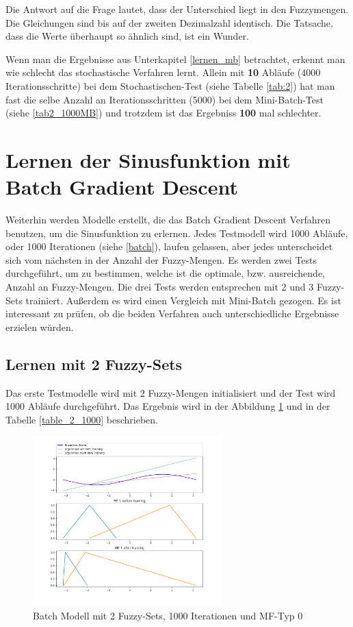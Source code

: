 {Die Antwort auf die Frage lautet, dass der Unterschied liegt in den Fuzzymengen. Die Gleichungen sind bis auf der zweiten Dezimalzahl identisch. Die Tatsache, dass die Werte überhaupt so ähnlich sind, ist ein Wunder.

Wenn man die Ergebnisse aus Unterkapitel \ref{lernen_mb} betrachtet, erkennt man wie schlecht das stochastische Verfahren lernt. Allein mit \textbf{10} Abläufe (4000 Iterationsschritte) bei dem Stochastischen-Test (siehe Tabelle \ref{tab:2}) hat man fast die selbe Anzahl an Iterationsschritten (5000) bei dem Mini-Batch-Test (siehe \ref{tab2_1000MB}) und trotzdem ist das Ergebniss \textbf{100} mal schlechter.

\section{Lernen der Sinusfunktion mit Batch Gradient Descent}
Weiterhin werden Modelle erstellt, die das Batch Gradient Descent Verfahren benutzen, um die Sinusfunktion zu erlernen. Jedes Testmodell wird 1000 Abläufe, oder 1000 Iterationen (siehe \ref{batch}), laufen gelassen, aber jedes unterscheidet sich vom nächsten in der Anzahl der Fuzzy-Mengen. Es werden zwei Tests durchgeführt, um zu bestimmen, welche ist die optimale, bzw. ausreichende, Anzahl an Fuzzy-Mengen. Die drei Tests werden entsprechen mit 2 und 3 Fuzzy-Sets trainiert. Außerdem es wird einen Vergleich mit Mini-Batch gezogen. Es ist interessant zu prüfen, ob die beiden Verfahren auch unterschiedliche Ergebnisse erzielen würden.

\subsection{Lernen mit 2 Fuzzy-Sets}\label{lernene_2S_b}
Das erste Testmodelle wird mit 2 Fuzzy-Mengen initialisiert und der Test wird 1000 Abläufe durchgeführt. Das Ergebnis wird in der Abbildung \ref{batch_2_1000} und in der Tabelle \ref{table_2_1000} beschrieben.

\begin{figure}[htbp]
	\centering
	\includegraphics[width=0.65\textwidth]{images/sinus/Batch/sinus 1 Input 2 Sets 1000 Epochs Batch Gradient Descent two equations mf.png}
	\caption{Batch Modell mit 2 Fuzzy-Sets, 1000 Iterationen und MF-Typ 0} \label{batch_2_1000}
\end{figure}

}
